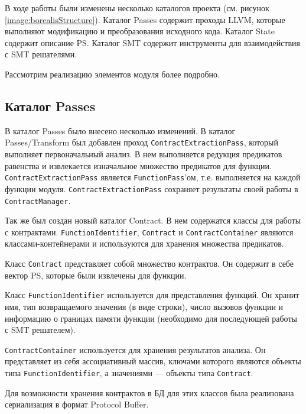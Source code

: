 В ходе работы были изменены несколько каталогов проекта (см. рисунок \ref{image:borealisStructure}). Каталог Passes содержит проходы LLVM, которые выполняют модификацию и преобразования исходного кода. Каталог State содержит описание PS. Каталог SMT содержит инструменты для взаимодействия с SMT решателями.

Рассмотрим реализацию элементов модуля более подробно.

\subsection{Каталог Passes}
В каталог Passes было внесено несколько изменений. В каталог Passes/Transform был добавлен проход \texttt{ContractExtractionPass}, который выполняет первоначальный анализ. В нем выполняется редукция предикатов равенства и извлекается изначальное множество предикатов для функции. \texttt{ContractExtractionPass} является \texttt{FunctionPass}'ом, т.е. выполняется на каждой функции модуля. \texttt{ContractExtractionPass} сохраняет результаты своей работы в \texttt{ContractManager}.

Так же был создан новый каталог Contract. В нем содержатся классы для работы с контрактами. \texttt{FunctionIdentifier}, \texttt{Contract} и \texttt{ContractContainer} являются классами-контейнерами и используются для хранения множества предикатов. 

Класс \texttt{Contract} представляет собой множество контрактов. Он содержит в себе вектор PS, которые были извлечены для функции.

Класс \texttt{FunctionIdentifier} используется для представления функций. Он хранит имя,  тип возвращаемого значения (в виде строки), число вызовов функции и информацию о границах памяти функции (необходимо для последующей работы с SMT решателем).

\texttt{ContractContainer} используется для хранения результатов анализа. Он представляет из себя ассоциативный массив, ключами которого являются объекты типа \texttt{FunctionIdentifier}, а значениями --- объекты типа \texttt{Contract}.

Для возможности хранения контрактов в БД для этих классов была реализована сериализация в формат Protocol Buffer\cite{protobuf}. 


